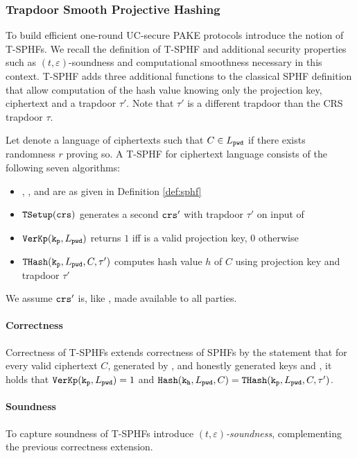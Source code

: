 \subsubsection{Trapdoor Smooth Projective Hashing}\label{sec:tsphf}
To build efficient one-round UC-secure PAKE protocols \citet{Benhamouda2013} introduce the notion of \acp{T-SPHF}.
We recall the definition of \ac{T-SPHF} and additional security properties such as $(t,\varepsilon)$-soundness and computational smoothness necessary in this context.
\ac{T-SPHF} adds three additional functions to the classical \ac{SPHF} definition that allow computation of the hash value knowing only the projection key, ciphertext and a trapdoor $\tau'$.
Note that $\tau'$ is a different trapdoor than the \ac{CRS} trapdoor $\tau$.

\begin{definition}\label{def:tsphf}
Let \Lpwd denote a language of ciphertexts such that $C\in L_\mathtt{pwd}$ if there exists randomness $r$ proving so.
A \acl{T-SPHF} for ciphertext language \Lpwd consists of the following seven algorithms:

\begin{itemize}
  \item \HKGen, \PKGen, \Hash and \PHash are as given in Definition \ref{def:sphf}
	\item $\mathtt{TSetup}(\mathtt{crs})$ generates a second $\mathtt{crs}'$ with trapdoor $\tau'$ on input of \crs
	\item $\mathtt{VerKp}(\mathtt{k_p}, L_\mathtt{pwd})$ returns $1$ iff \hp is a valid projection key, $0$ otherwise
	\item $\mathtt{THash}(\mathtt{k_p}, L_\mathtt{pwd}, C, \tau')$ computes hash value $h$ of $C$ using  projection key \hp and trapdoor $\tau'$
\end{itemize}

\noindent
We assume $\mathtt{crs}'$ is, like \crs, made available to all parties.
\eod
\end{definition}

\paragraph{Correctness} Correctness of \acp{T-SPHF} extends correctness of \acp{SPHF} by the statement that for every valid ciphertext $C$, generated by \cL, and honestly generated keys \hk and \hp, it holds that $\mathtt{VerKp}(\mathtt{k_p}, L_\mathtt{pwd})=1$ and $\mathtt{Hash}(\mathtt{k_h}, L_\mathtt{pwd}, C)=\mathtt{THash}(\mathtt{k_p}, L_\mathtt{pwd}, C, \tau')$.

\paragraph{Soundness}
To capture soundness of \acp{T-SPHF} \citet{Benhamouda2013} introduce \emph{$(t,\varepsilon)$-soundness}, complementing the previous correctness extension.

